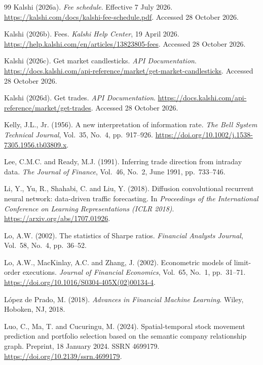 \documentclass[12pt,a4paper,oneside]{report}
\begin{document}
\begin{thebibliography}{99}
Kalshi (2026a). \textit{Fee schedule}. Effective 7 July 2026.
\url{https://kalshi.com/docs/kalshi-fee-schedule.pdf}.
Accessed 28 October 2026.

Kalshi (2026b). Fees. \textit{Kalshi Help Center}, 19 April 2026.
\url{https://help.kalshi.com/en/articles/13823805-fees}.
Accessed 28 October 2026.

Kalshi (2026c). Get market candlesticks. \textit{API Documentation}.
\url{https://docs.kalshi.com/api-reference/market/get-market-candlesticks}.
Accessed 28 October 2026.

Kalshi (2026d). Get trades. \textit{API Documentation}.
\url{https://docs.kalshi.com/api-reference/market/get-trades}.
Accessed 28 October 2026.

Kelly, J.L., Jr. (1956). A new interpretation of information rate.
\textit{The Bell System Technical Journal}, Vol.~35, No.~4, pp.~917--926.
\url{https://doi.org/10.1002/j.1538-7305.1956.tb03809.x}.

Lee, C.M.C. and Ready, M.J. (1991). Inferring trade direction from intraday
data. \textit{The Journal of Finance}, Vol.~46, No.~2, June 1991, pp.~733--746.

Li, Y., Yu, R., Shahabi, C. and Liu, Y. (2018). Diffusion convolutional recurrent
neural network: data-driven traffic forecasting. In \textit{Proceedings of the
International Conference on Learning Representations (ICLR 2018)}.
\url{https://arxiv.org/abs/1707.01926}.

Lo, A.W. (2002). The statistics of Sharpe ratios. \textit{Financial Analysts
Journal}, Vol.~58, No.~4, pp.~36--52.

Lo, A.W., MacKinlay, A.C. and Zhang, J. (2002). Econometric models of limit-order
executions. \textit{Journal of Financial Economics}, Vol.~65, No.~1, pp.~31--71.
\url{https://doi.org/10.1016/S0304-405X(02)00134-4}.

L\'opez de Prado, M. (2018). \textit{Advances in Financial Machine Learning}.
Wiley, Hoboken, NJ, 2018.

Luo, C., Ma, T. and Cucuringu, M. (2024). Spatial-temporal stock movement
prediction and portfolio selection based on the semantic company relationship
graph. Preprint, 18 January 2024. SSRN 4699179.
\url{https://doi.org/10.2139/ssrn.4699179}.


\end{thebibliography}
\end{document}
